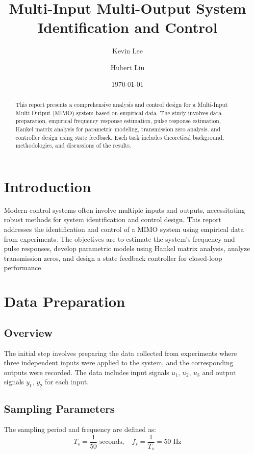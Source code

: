 \documentclass[12pt]{article}
\title{Multi-Input Multi-Output System Identification and Control}
\author{Kevin Lee \and Hubert Liu}
\date{\today}
\begin{document}
\maketitle

\begin{abstract}
This report presents a comprehensive analysis and control design for a Multi-Input Multi-Output (MIMO) system based on empirical data. The study involves data preparation, empirical frequency response estimation, pulse response estimation, Hankel matrix analysis for parametric modeling, transmission zero analysis, and controller design using state feedback. Each task includes theoretical background, methodologies, and discussions of the results.
\end{abstract}

\tableofcontents

\newpage

\section{Introduction}
Modern control systems often involve multiple inputs and outputs, necessitating robust methods for system identification and control design. This report addresses the identification and control of a MIMO system using empirical data from experiments. The objectives are to estimate the system's frequency and pulse responses, develop parametric models using Hankel matrix analysis, analyze transmission zeros, and design a state feedback controller for closed-loop performance.

\section{Data Preparation}
\subsection{Overview}
The initial step involves preparing the data collected from experiments where three independent inputs were applied to the system, and the corresponding outputs were recorded. The data includes input signals $u_1$, $u_2$, $u_3$ and output signals $y_1$, $y_2$ for each input.

\subsection{Sampling Parameters}
The sampling period and frequency are defined as:
\begin{equation}
    T_s = \frac{1}{50} \text{ seconds}, \quad f_s = \frac{1}{T_s} = 50 \text{ Hz}
\end{equation}
\end{document}
